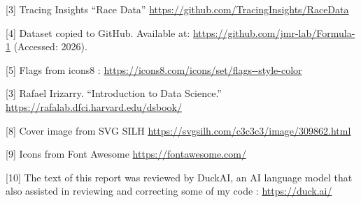 \documentclass[
]{article}
\begin{document}
{[}3{]} Tracing Insights ``Race Data''
\url{https://github.com/TracingInsights/RaceData}

\vspace{10pt}

{[}4{]} Dataset copied to GitHub. Available at:
\url{https://github.com/jmr-lab/Formula-1} (Accessed: 2026).

\vspace{10pt}

{[}5{]} Flags from icons8 :
\url{https://icons8.com/icons/set/flags--style-color}

\vspace{10pt}

{[}3{]} Rafael Irizarry. ``Introduction to Data Science.''
\url{https://rafalab.dfci.harvard.edu/dsbook/}

\vspace{10pt}

{[}8{]} Cover image from SVG SILH
\url{https://svgsilh.com/c3c3c3/image/309862.html}

\vspace{10pt}

{[}9{]} Icons from Font Awesome \url{https://fontawesome.com/}

\vspace{10pt}

{[}10{]} The text of this report was reviewed by DuckAI, an AI language
model that also assisted in reviewing and correcting some of my code :
\url{https://duck.ai/}
\end{document}
